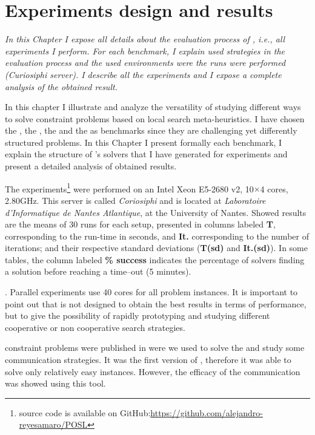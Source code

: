 \chapter{Experiments design and results}
\label{chap:expe}
\textit{In this Chapter I expose all details about the evaluation process of \posl{}, i.e., all experiments I perform. For each benchmark, I explain used strategies in the evaluation process and the used environments were the runs were performed (\textit{Curiosiphi} server). %
I describe all the experiments and I expose a complete analysis of the obtained result.}
\vfill
\minitoc
\newpage

In this chapter I illustrate and analyze the versatility of \posl{} studying different ways to solve constraint problems based on local search meta-heuristics. 
I have chosen the \sgp, the \nqp, the \carrp{} and the \grp{} as benchmarks since they are challenging yet differently structured problems. In this Chapter I present formally each benchmark, I explain the structure of \posl's solvers that I have generated for experiments and present a detailed analysis of obtained results.

The experiments\footnote{\posl{} source code is available on GitHub:\href{https://github.com/alejandro-reyesamaro/POSL}{https://github.com/alejandro-reyesamaro/POSL}} 
were performed on an Intel\R{} Xeon\TM{} E5-2680 v2, 10$\times$4 cores, 2.80GHz. This server is called \textit{Coriosiphi} and is located at \textit{Laboratoire d'Informatique de Nantes Atlantique}, at the University of Nantes. Showed results are the means of 30 runs for each setup, presented in columns labeled {\bf T}, corresponding to the run-time in seconds, and {\bf It.} corresponding to the number of iterations; and their respective standard deviations ({\bf T(sd)} and {\bf It.(sd)}). In some tables, the column labeled \textbf{\% success} indicates the percentage of solvers finding a solution before reaching a time--out (5 minutes).

. Parallel experiments use 40 cores for all problem instances. It is important to point out that \posl{} is not designed to obtain the best results in terms of performance, but to give the possibility of rapidly prototyping and studying different cooperative or non cooperative search strategies.


 constraint problems were published in \cite{Reyes-amaro} were we used \posl{} to solve the \sgp{} and study some communication strategies. It was the first version of \posl{}, therefore it was able to solve only relatively easy instances. However, the efficacy of the communication was showed using this tool.

